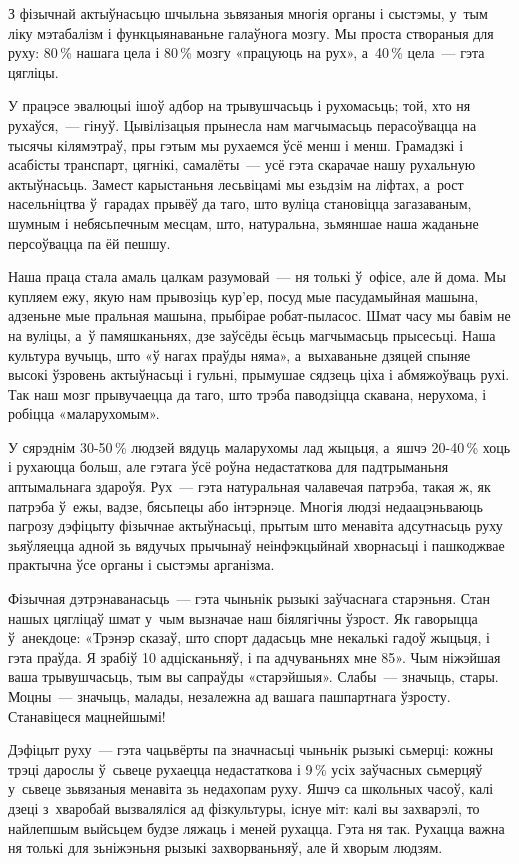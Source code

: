 З фізычнай актыўнасьцю шчыльна зьвязаныя многія органы і сыстэмы, у~тым ліку мэтабалізм і функцыянаваньне галаўнога мозгу. Мы проста створаныя для руху: 80\,\% нашага цела і 80\,\% мозгу «працуюць на рух», а~40\,\% цела~--- гэта цягліцы.

У працэсе эвалюцыі ішоў адбор на трывушчасьць і рухомасьць; той, хто ня рухаўся,~--- гінуў. Цывілізацыя прынесла нам магчымасьць перасоўвацца на тысячы кілямэтраў, пры гэтым мы рухаемся ўсё менш і менш. Грамадзкі і асабісты транспарт, цягнікі, самалёты~--- усё гэта скарачае нашу рухальную актыўнасьць. Замест карыстаньня лесьвіцамі мы езьдзім на ліфтах, а~рост насельніцтва ў~гарадах прывёў да таго, што вуліца становіцца загазаваным, шумным і небясьпечным месцам, што, натуральна, зьмяншае наша жаданьне персоўвацца па ёй пешшу.

Наша праца стала амаль цалкам разумовай~--- ня толькі ў~офісе, але й дома. Мы купляем ежу, якую нам прывозіць кур'ер, посуд мые пасудамыйная машына, адзеньне мые пральная машына, прыбірае робат-пыласос. Шмат часу мы бавім не на вуліцы, а~ў памяшканьнях, дзе заўсёды ёсьць магчымасьць прысесьці. Наша культура вучыць, што «ў нагах праўды няма», а~выхаваньне дзяцей спыняе высокі ўзровень актыўнасьці і гульні, прымушае сядзець ціха і абмяжоўваць рухі. Так наш мозг прывучаецца да таго, што трэба паводзіцца скавана, нерухома, і робіцца «маларухомым».

У сярэднім 30-50\,\% людзей вядуць маларухомы лад жыцьця, а~яшчэ 20-40\,\% хоць і рухаюцца больш, але гэтага ўсё роўна недастаткова для падтрыманьня аптымальнага здароўя. Рух~--- гэта натуральная чалавечая патрэба, такая ж, як патрэба ў~ежы, вадзе, бясьпецы або інтэрнэце. Многія людзі недаацэньваюць пагрозу дэфіцыту фізычнае актыўнасьці, прытым што менавіта адсутнасьць руху зьяўляецца адной зь вядучых прычынаў неінфэкцыйнай хворнасьці і пашкоджвае практычна ўсе органы і сыстэмы арганізма.

Фізычная дэтрэнаванасьць~--- гэта чыньнік рызыкі заўчаснага старэньня. Стан нашых цягліцаў шмат у~чым вызначае наш біялягічны ўзрост. Як гаворыцца ў~анекдоце: «Трэнэр сказаў, што спорт дадасьць мне некалькі гадоў жыцьця, і гэта праўда. Я зрабіў 10 адцісканьняў, і па адчуваньнях мне 85». Чым ніжэйшая ваша трывушчасьць, тым вы сапраўды «старэйшыя». Слабы~--- значыць, стары. Моцны~--- значыць, малады, незалежна ад вашага пашпартнага ўзросту. Станавіцеся мацнейшымі!

Дэфіцыт руху~--- гэта чацьвёрты па значнасьці чыньнік рызыкі сьмерці: кожны трэці дарослы ў~сьвеце рухаецца недастаткова і 9\,\% усіх заўчасных сьмерцяў у~сьвеце зьвязаныя менавіта зь недахопам руху. Яшчэ са школьных часоў, калі дзеці з~хваробай вызваляліся ад фізкультуры, існуе міт: калі вы захварэлі, то найлепшым выйсьцем будзе ляжаць і меней рухацца. Гэта ня так. Рухацца важна ня толькі для зьніжэньня рызыкі захворваньняў, але й хворым людзям.

